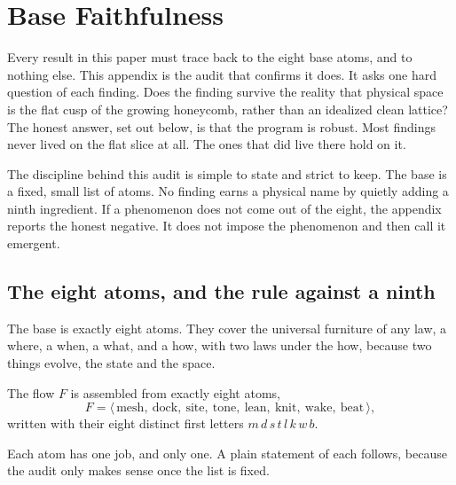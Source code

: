 \section{Base Faithfulness}

Every result in this paper must trace back to the eight base atoms, and to nothing else. This appendix is the audit that confirms it does. It asks one hard question of each finding. Does the finding survive the reality that physical space is the flat cusp of the growing honeycomb, rather than an idealized clean lattice? The honest answer, set out below, is that the program is robust. Most findings never lived on the flat slice at all. The ones that did live there hold on it.

The discipline behind this audit is simple to state and strict to keep. The base is a fixed, small list of atoms. No finding earns a physical name by quietly adding a ninth ingredient. If a phenomenon does not come out of the eight, the appendix reports the honest negative. It does not impose the phenomenon and then call it emergent.

\subsection{The eight atoms, and the rule against a ninth}

The base is exactly eight atoms. They cover the universal furniture of any law, a where, a when, a what, and a how, with two laws under the how, because two things evolve, the state and the space.

\begin{axiom}
The flow $F$ is assembled from exactly eight atoms,
\[
F = \langle\, \text{mesh},\ \text{dock},\ \text{site},\ \text{tone},\ \text{lean},\ \text{knit},\ \text{wake},\ \text{beat}\,\rangle ,
\]
written with their eight distinct first letters $m\, d\, s\, t\, l\, k\, w\, b$.
\end{axiom}

Each atom has one job, and only one. A plain statement of each follows, because the audit only makes sense once the list is fixed.

